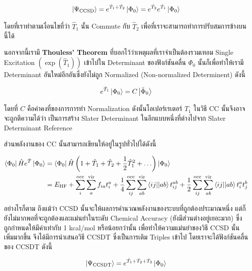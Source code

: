 \begin{equation}
  \ket{\Psi_{\mathrm{CCSD}}}
  = e^{\hat{T}_1 + \hat{T}_2} \ket{\Phi_0}
  = e^{\hat{T}_2}e^{\hat{T}_1} \ket{\Phi_0}
\end{equation}

\noindent โดยที่เราทำตามเงื่อนไขที่ว่า $\hat{T}_1$ นั้น Commute กับ $\hat{T}_2$ เพื่อที่เราจะสามารถทำการปรับสมการข้างบนนี้ได้

นอกจากนี้เรามี \textbf{Thouless' Theorem} ที่บอกไว้ว่าเหตุผลที่เราจำเป็นต้องรวมเทอม Single Excitation $(\exp(\hat{T}_1))$
เข้าไปใน Determinant ของฟังก์ชันคลื่น $\Phi_0$ นั้นก็เพื่อทำให้เรามี Determinant อันใหม่อีกอันซึ่งยังไม่ถูก Normalized (Non-normalized
Determinent) ดังนี้

\begin{equation}
  e^{\hat{T}_1} \ket{\Phi_0} = C \ket{\tilde{\Phi}_0}
\end{equation}

\noindent โดยที่ $C$ คือค่าคงที่ของการการทำ Normalization ดังนั้นโอเปอร์เรเตอร์ $\hat{T}_1$ ในวิธี CC นั้นจึงอาจจะถูกตีความได้ว่า%
เป็นการสร้าง Slater Determinant ในอีกแบบหนึ่งที่ต่างไปจาก Slater Determinant Reference

ส่วนพลังงานของ CC นั้นสามารถเขียนให้อยู่ในรูปทั่วไปได้ดังนี้

\begin{equation}
  \begin{split}
    \bra{\Phi_0}\hat{H}e^{\hat{T}}\ket{\Phi_0}
    &= \bra{\Phi_0}\hat{H}
    \left(1 + \hat{T}_1 + \hat{T}_2  + \frac{1}{2} \hat{T}_1^2+ \ldots\right)\ket{\Phi_0} \\
    &= E_{\mathrm{HF}} +
    \sum_{i}^{\mathrm{occ}} \sum_{a}^{\mathrm{vir}} f_{ia} t_{i}^{a}
    + \frac{1}{4} \sum_{ij}^{\mathrm{occ}} \sum_{ab}^{\mathrm{vir}} \bra{ij}\!\ket{ab} t_{ij}^{ab}
    + \frac{1}{2} \sum_{ij}^{\mathrm{occ}} \sum_{ab}^{\mathrm{vir}} \bra{ij}\!\ket{ab} t_{i}^{a} t_{j}^{b}
  \end{split}
\end{equation}

อย่างไรก็ตาม ถึงแม้ว่า CCSD นั้นจะให้ผลการคำนวณพลังงานของระบบที่ถูกต้องประมาณหนึ่ง แต่ก็ยังไม่มากพอที่จะถูกต้องและแม่นยำในระดับ Chemical
Accuracy (ยังมีส่วนต่างอยู่เยอะมาก) ซึ่งถูกกำหนดให้มีค่าเท่ากับ 1 kcal/mol หรือน้อยกว่านั้น เพื่อทำให้ความแม่นยำของวิธี CCSD นั้นเพิ่มมากขึ้น
จึงได้มีการนำเสนอวิธี CCSDT ซึ่งเป็นการเติม Triples เข้าไป โดยเราจะได้ฟังก์ชันคลื่นของ CCSDT ดังนี้

\begin{equation}
  \ket{\Psi_{\mathrm{CCSDT}}}
  =
  e^{\hat{T}_1 + \hat{T}_2+ \hat{T}_3} \ket{\Phi_0}
\end{equation}

